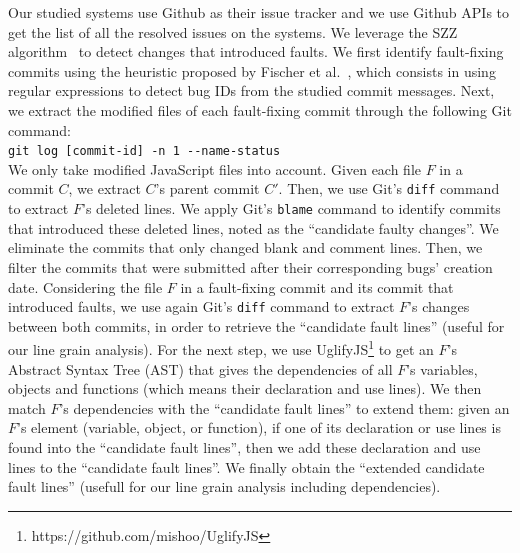  Our studied systems use Github as their issue tracker and we use Github APIs to get the list of all the resolved issues on the systems. We leverage the SZZ algorithm~\cite{sliwerski2005changes} to detect changes that introduced faults. We first identify fault-fixing commits using the heuristic proposed by Fischer et al.~\cite{fischer2003populating}, which consists in using regular expressions to detect bug IDs from the studied commit messages. Next, we extract the modified files of each fault-fixing commit through the following Git command:\\

\texttt{git log [commit-id] -n 1 {-{}-}name-status}\\

\noindent
We only take modified JavaScript files into account. Given each file $F$ in a commit $C$, we extract $C$'s parent commit $C'$. Then, we use Git's \texttt{diff} command to extract $F$'s deleted lines. We apply Git's \texttt{blame} command to identify commits that introduced these deleted lines, noted as the ``candidate faulty changes''. We eliminate the commits that only changed blank and comment lines. Then, we filter the commits that were submitted after their corresponding bugs' creation date. {\color{blue}Considering the file $F$ in a fault-fixing commit and its commit that introduced faults, we use again Git's \texttt{diff} command to extract $F$'s changes between both commits, in order to retrieve the ``candidate fault lines'' (useful for our line grain analysis). For the next step, we use UglifyJS\footnote{https://github.com/mishoo/UglifyJS} to get an $F$'s Abstract Syntax Tree (AST) that gives the dependencies of all $F$'s variables, objects and functions (which means their declaration and use lines). We then match $F$'s dependencies with the ``candidate fault lines'' to extend them: given an $F$'s element (variable, object, or function), if one of its declaration or use lines is found into the ``candidate fault lines'', then we add these declaration and use lines to the ``candidate fault lines''. We finally obtain the ``extended candidate fault lines'' (usefull for our line grain analysis including dependencies).
}

